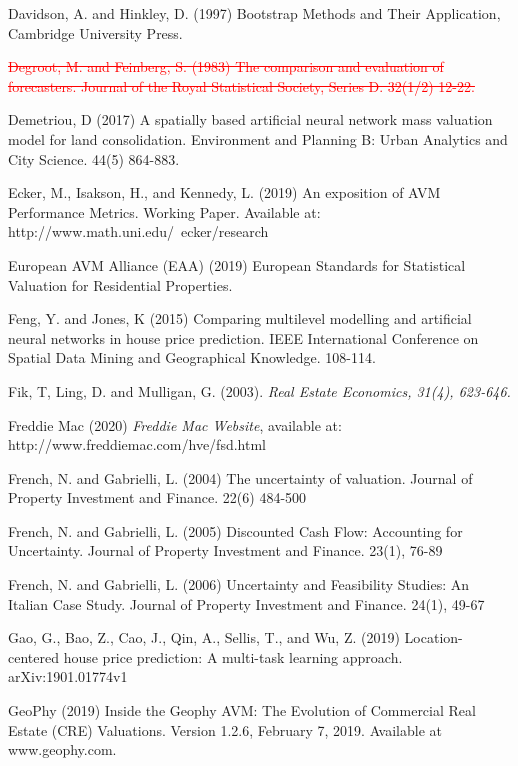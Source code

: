 \documentclass[colTwo]{anon}
\theoremstyle{definition}
\begin{document}
\begin{thebibliography}{50}
\harvarditem{}{}{}Davidson, A. and Hinkley, D. (1997) Bootstrap Methods and Their Application, Cambridge University Press.  

\harvarditem{}{}{} \textcolor{red}{\st{Degroot, M. and Feinberg, S. (1983) The comparison and evaluation of forecasters. Journal of the Royal Statistical Society, Series D. 32(1/2) 12-22.}}

\harvarditem{}{}{}Demetriou, D (2017) A spatially based artificial neural network mass valuation model for land consolidation. Environment and Planning B: Urban Analytics and City Science. 44(5) 864-883. 

\harvarditem{}{}{}Ecker, M., Isakson, H., and Kennedy, L. (2019) An exposition of AVM Performance Metrics.  Working Paper.  Available at: http://www.math.uni.edu/~ecker/research

\harvarditem{}{}{}European AVM Alliance (EAA) (2019) European Standards for Statistical Valuation for Residential Properties. 

\harvarditem{}{}{}Feng, Y. and Jones, K (2015) Comparing multilevel modelling and artificial neural networks in house price prediction. IEEE International Conference on Spatial Data Mining and Geographical Knowledge. 108-114.

\harvarditem{}{}{}Fik, T, Ling, D. and Mulligan, G. (2003). \it{Real Estate Economics}, 31(4), 623-646. 

\harvarditem{}{}{}Freddie Mac (2020) \textit{Freddie Mac Website}, available at: http://www.freddiemac.com/hve/fsd.html

\harvarditem{}{}{}French, N. and Gabrielli, L. (2004) The uncertainty of valuation.  Journal of Property Investment and Finance. 22(6) 484-500

\harvarditem{}{}{}French, N. and Gabrielli, L. (2005) Discounted Cash Flow: Accounting for Uncertainty.  Journal of Property Investment and Finance. 23(1), 76-89

\harvarditem{}{}{}French, N. and Gabrielli, L. (2006) Uncertainty and Feasibility Studies: An Italian Case Study.  Journal of Property Investment and Finance. 24(1), 49-67

\harvarditem{}{}{}Gao, G., Bao, Z., Cao, J., Qin, A., Sellis, T., and Wu, Z. (2019) Location-centered house price prediction: A multi-task learning approach. arXiv:1901.01774v1

\harvarditem{}{}{}GeoPhy (2019) Inside the Geophy AVM: The Evolution of Commercial Real Estate (CRE) Valuations. Version 1.2.6, February 7, 2019.  Available at www.geophy.com. 


\end{thebibliography}
\end{document}
